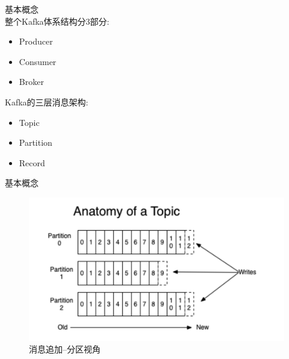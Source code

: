 \begin{frame}[plain,t]{基本概念} %
 \\  
	 \vspace{2ex}
	 整个Kafka体系结构分3部分:
	 \begin{itemize}
	 	\item Producer
	 	\item Consumer
	 	\item Broker
	 \end{itemize}
 
 \vspace{2ex}
 Kafka的三层消息架构:
 \begin{itemize}
 	\item Topic
 	\item Partition
 	\item Record
 \end{itemize}
 
 
	
	
	
\end{frame}
\begin{frame}[plain,t]{基本概念} %
	 \\  
	 \vspace{2ex}
	 \begin{figure}
	 	\centering
	 	\includegraphics[width=0.9\linewidth]{image/0103}
	 	\caption{消息追加--分区视角}
	 	\label{fig:0103}
	 \end{figure}
	 
\end{frame}
